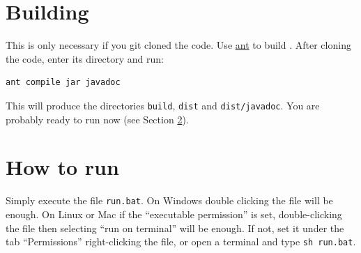 \section{Building}\label{sec:building}

This is only necessary if you git cloned the code. Use \href{http://ant.apache.org/}{ant} to build \PET. After cloning the code, enter its directory and run:

\begin{lstlisting}[style=BashStyle]
ant compile jar javadoc
\end{lstlisting}

This will produce the directories \texttt{build}, \texttt{dist} and \texttt{dist/javadoc}.
You are probably ready to run \PET now (see Section \ref{sec:run}).


\section{How to run}\label{sec:run}

Simply execute the file {\tt run.bat}.
On Windows double clicking the file will be enough.
On Linux or Mac if the ``executable permission'' is set, double-clicking the file then selecting ``run on terminal'' will be enough. If not, set it under the tab ``Permissions'' right-clicking the file, or open a terminal and type {\tt sh run.bat}.